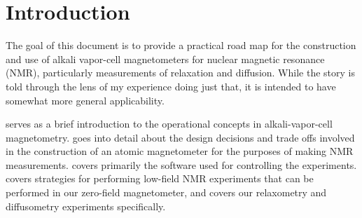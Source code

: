 \documentclass[PaulGanssle-Thesis.tex]{subfiles}
\begin{document}
\chapter{Introduction}
\label{Chapter:Introduction}
The goal of this document is to provide a practical road map for the construction and use of alkali vapor-cell magnetometers for nuclear magnetic resonance (NMR), particularly measurements of relaxation and diffusion. While the story is told through the lens of my experience doing just that, it is intended to have somewhat more general applicability. 

 serves as a brief introduction to the operational concepts in alkali-vapor-cell magnetometry.  goes into detail about the design decisions and trade offs involved in the construction of an atomic magnetometer for the purposes of making NMR measurements.  covers primarily the software used for controlling the experiments.  covers strategies for performing low-field NMR experiments that can be performed in our zero-field magnetometer, and  covers our relaxometry and diffusometry experiments specifically.
\end{document}
